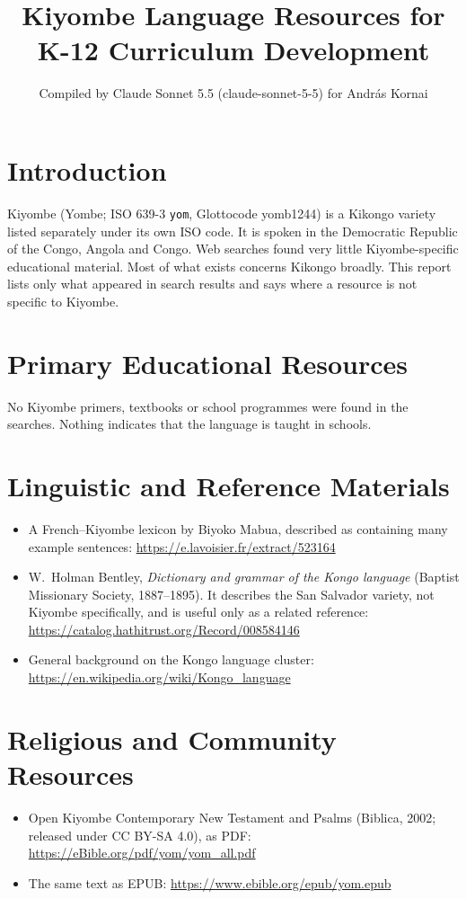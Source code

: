 \documentclass[12pt]{article}
\title{Kiyombe Language Resources for K-12 Curriculum Development}
\author{Compiled by Claude Sonnet 5.5 (claude-sonnet-5-5) for Andr\'as Kornai}
\date{}
\begin{document}
\maketitle

\section{Introduction}
Kiyombe (Yombe; ISO 639-3 \texttt{yom}, Glottocode yomb1244) is a Kikongo variety listed separately under its own ISO code. It is spoken in the Democratic Republic of the Congo, Angola and Congo. Web searches found very little Kiyombe-specific educational material. Most of what exists concerns Kikongo broadly. This report lists only what appeared in search results and says where a resource is not specific to Kiyombe.

\section{Primary Educational Resources}
No Kiyombe primers, textbooks or school programmes were found in the searches. Nothing indicates that the language is taught in schools.

\section{Linguistic and Reference Materials}
\begin{itemize}
\item A French--Kiyombe lexicon by Biyoko Mabua, described as containing many example sentences: \url{https://e.lavoisier.fr/extract/523164}
\item W.\ Holman Bentley, \emph{Dictionary and grammar of the Kongo language} (Baptist Missionary Society, 1887--1895). It describes the San Salvador variety, not Kiyombe specifically, and is useful only as a related reference: \url{https://catalog.hathitrust.org/Record/008584146}
\item General background on the Kongo language cluster: \url{https://en.wikipedia.org/wiki/Kongo_language}
\end{itemize}

\section{Religious and Community Resources}
\begin{itemize}
\item Open Kiyombe Contemporary New Testament and Psalms (Biblica, 2002; released under CC BY-SA 4.0), as PDF: \url{https://eBible.org/pdf/yom/yom_all.pdf}
\item The same text as EPUB: \url{https://www.ebible.org/epub/yom.epub}
\end{itemize}
\end{document}
